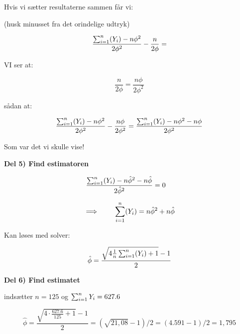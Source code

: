 Hvis vi sætter resultaterne sammen får vi:

(husk minusset fra det orindelige udtryk)

\begin{equation}
     \frac{\sum_{i=1}^{n}( Y_i ) - n \phi^2}{2\phi^2} - \frac{n}{2\phi}  =
\end{equation}

VI ser at:

\begin{equation}
    \frac{n}{2\phi}  = \frac{n\phi}{2\phi^2}
\end{equation}

sådan at:

\begin{equation}
     \frac{\sum_{i=1}^{n}( Y_i ) - n \phi^2}{2\phi^2} - \frac{n\phi}{2\phi^2}  = \frac{\sum_{i=1}^{n}( Y_i ) - n \phi^2 - n\phi}{2\phi^2}
\end{equation}

Som var det vi skulle vise!

\textbf{Del 5) Find estimatoren}

\begin{align}
     \frac{\sum_{i=1}^{n}( Y_i ) - n \hat{\phi}^2 - n \hat{\phi}}{2\hat{\phi}^2} &= 0
\end{align}

\begin{equation}
    \implies \qquad \sum_{i=1}^{n}( Y_i ) = n \hat{\phi}^2 + n\hat{\phi}
\end{equation}


Kan løses med solver:

\begin{equation}
\hat{\phi} = \frac{\sqrt{4 \frac{1}{n} \sum_{i=1}^{n} (Y_i)  + 1} - 1}{2}
\end{equation}

\textbf{Del 6) Find estimatet}

indsætter $n=125$ og $\sum_{i=1}^{n} Y_i = 627.6$

\begin{equation}
\hat{\phi} = \frac{\sqrt{4 \cdot \frac{627.6}{125}  + 1} - 1}{2} = (\sqrt{21,08} - 1) / 2 = (4.591 - 1) / 2 = 1,795
\end{equation}


